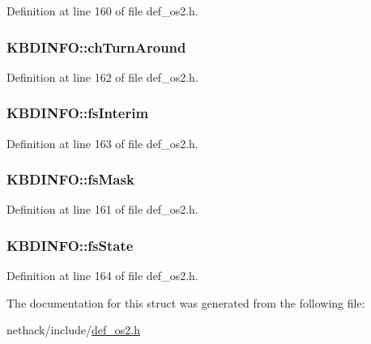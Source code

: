 Definition at line 160 of file def\+\_\+os2.\+h.

\hypertarget{structKBDINFO_a08d50861a69bcf4007ef1af2a53d4469}{
\subsubsection[{ch\+Turn\+Around}]{ K\+B\+D\+I\+N\+F\+O\+::ch\+Turn\+Around}}\label{structKBDINFO_a08d50861a69bcf4007ef1af2a53d4469}


Definition at line 162 of file def\+\_\+os2.\+h.

\hypertarget{structKBDINFO_aa68a672490ccdb771add54bf340205b9}{
\subsubsection[{fs\+Interim}]{ K\+B\+D\+I\+N\+F\+O\+::fs\+Interim}}\label{structKBDINFO_aa68a672490ccdb771add54bf340205b9}


Definition at line 163 of file def\+\_\+os2.\+h.

\hypertarget{structKBDINFO_a591037a8e9b6507d57c532a332b919a5}{
\subsubsection[{fs\+Mask}]{ K\+B\+D\+I\+N\+F\+O\+::fs\+Mask}}\label{structKBDINFO_a591037a8e9b6507d57c532a332b919a5}


Definition at line 161 of file def\+\_\+os2.\+h.

\hypertarget{structKBDINFO_a0772532c2e0c2ea7f3f4f1a42bd32f5e}{
\subsubsection[{fs\+State}]{ K\+B\+D\+I\+N\+F\+O\+::fs\+State}}\label{structKBDINFO_a0772532c2e0c2ea7f3f4f1a42bd32f5e}


Definition at line 164 of file def\+\_\+os2.\+h.



The documentation for this struct was generated from the following file\+:\begin{DoxyCompactItemize}
\item 
nethack/include/\hyperlink{def__os2_8h}{def\+\_\+os2.\+h}\end{DoxyCompactItemize}
